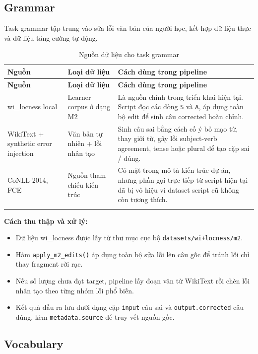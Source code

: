 \documentclass[12pt,a4paper]{article}
\begin{document}
\subsection{Grammar}

Task grammar tập trung vào sửa lỗi văn bản của người học, kết hợp dữ liệu thực và dữ liệu tăng cường tự động.

\begin{longtable}{p{3.2cm}p{4.3cm}p{7cm}}
\toprule
\textbf{Nguồn} & \textbf{Loại dữ liệu} & \textbf{Cách dùng trong pipeline} \\
\midrule
\endfirsthead
\toprule
\textbf{Nguồn} & \textbf{Loại dữ liệu} & \textbf{Cách dùng trong pipeline} \\
\midrule
\endhead
wi\_locness local & Learner corpus ở dạng M2 & Là nguồn chính trong triển khai hiện tại. Script đọc các dòng \texttt{S} và \texttt{A}, áp dụng toàn bộ edit để sinh câu corrected hoàn chỉnh. \\
WikiText + synthetic error injection & Văn bản tự nhiên + lỗi nhân tạo & Sinh câu sai bằng cách cố ý bỏ mạo từ, thay giới từ, gây lỗi subject-verb agreement, tense hoặc plural để tạo cặp sai / đúng. \\
CoNLL-2014, FCE & Nguồn tham chiếu kiến trúc & Có mặt trong mô tả kiến trúc dự án, nhưng phần gọi trực tiếp từ script hiện tại đã bị vô hiệu vì dataset script cũ không còn tương thích. \\
\bottomrule
\caption{Nguồn dữ liệu cho task grammar}
\end{longtable}

\textbf{Cách thu thập và xử lý:}
\begin{itemize}[leftmargin=1.2cm]
    \item Dữ liệu wi\_locness được lấy từ thư mục cục bộ \texttt{datasets/wi+locness/m2}.
    \item Hàm \texttt{apply\_m2\_edits()} áp dụng toàn bộ sửa lỗi lên câu gốc để tránh lỗi chỉ thay fragment rời rạc.
    \item Nếu số lượng chưa đạt target, pipeline lấy đoạn văn từ WikiText rồi chèn lỗi nhân tạo theo từng nhóm lỗi phổ biến.
    \item Kết quả đầu ra lưu dưới dạng cặp \texttt{input} câu sai và \texttt{output.corrected} câu đúng, kèm \texttt{metadata.source} để truy vết nguồn gốc.
\end{itemize}

\subsection{Vocabulary}
\end{document}
